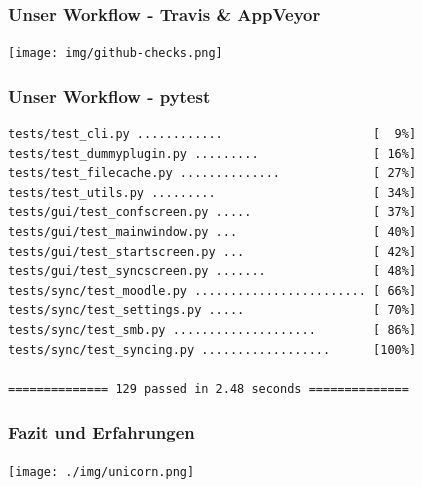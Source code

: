 \documentclass{beamer}
\begin{document}
	\begin{frame}
	\frametitle{Unser Workflow - Travis \& AppVeyor}
	\texttt{[image: img/github-checks.png]}
	\end{frame}

	\begin{frame}[fragile]
	\frametitle{Unser Workflow - pytest}
  \begin{verbatim}
tests/test_cli.py ............                     [  9%]
tests/test_dummyplugin.py .........                [ 16%]
tests/test_filecache.py ..............             [ 27%]
tests/test_utils.py .........                      [ 34%]
tests/gui/test_confscreen.py .....                 [ 37%]
tests/gui/test_mainwindow.py ...                   [ 40%]
tests/gui/test_startscreen.py ...                  [ 42%]
tests/gui/test_syncscreen.py .......               [ 48%]
tests/sync/test_moodle.py ........................ [ 66%]
tests/sync/test_settings.py .....                  [ 70%]
tests/sync/test_smb.py ....................        [ 86%]
tests/sync/test_syncing.py ..................      [100%]

============== 129 passed in 2.48 seconds ==============
  \end{verbatim}
\end{frame}

	
	\begin{frame}
	\frametitle{Fazit und Erfahrungen}
\begin{center}
	\texttt{[image: ./img/unicorn.png]}
	\end{center}
	\end{frame}
	
\end{document}
